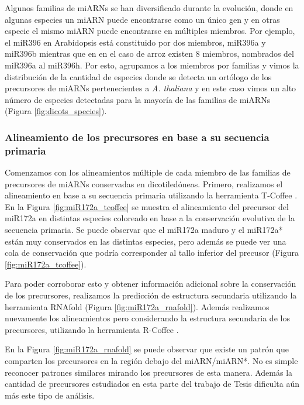 Algunos familias de miARNs se han diversificado durante la evolución, donde en algunas especies un miARN puede encontrarse como un único gen y en otras especie el mismo miARN puede encontrarse en múltiples miembros.
Por ejemplo, el miR396 en Arabidopsis está constituido por dos miembros, miR396a y miR396b mientras que en en el caso de arroz existen 8 miembros, nombrados del miR396a al miR396h.
Por esto, agrupamos a los miembros por familias y vimos la distribución de la cantidad de especies donde se detecta un ortólogo de los precursores de miARNs pertenecientes a \textit{A. thaliana} y en este caso vimos un alto número de especies detectadas para la mayoría de las familias de miARNs (Figura \ref{fig:dicots_species}).

\subsubsection{Alineamiento de los precursores en base a su secuencia primaria}

Comenzamos con los alineamientos múltiple de cada miembro de las familias de precursores de miARNs conservadas en dicotiledóneas.
Primero, realizamos el alineamiento en base a su secuencia primaria utilizando la herramienta T-Coffee \citep{pmid10964570}.
En la Figura \ref{fig:miR172a_tcoffee} se muestra el alineamiento del precursor del miR172a en distintas especies coloreado en base a la conservación evolutiva de la secuencia primaria.
Se puede observar que el miR172a maduro y el miR172a* están muy conservados en las distintas especies, pero además se puede ver una cola de conservación que podría corresponder al tallo inferior del precusor (Figura \ref{fig:miR172a_tcoffee}).

Para poder corroborar esto y obtener información adicional sobre la conservación de los precursores, realizamos la predicción de estructura secundaria utilizando la herramienta RNAfold \citep{pmid22115189} (Figura \ref{fig:miR172a_rnafold}).
Además realizamos nuevamente los alineamientos pero considerando la estructura secundaria de los precursores, utilizando la herramienta R-Coffee \citep{pmid18292307}.

En la Figura \ref{fig:miR172a_rnafold} se puede observar que existe un patrón que comparten los precursores en la región debajo del miARN/miARN*.
No es simple reconocer patrones similares mirando los precursores de esta manera.
Además la cantidad de precursores estudiados en esta parte del trabajo de Tesis dificulta aún más este tipo de análisis.

